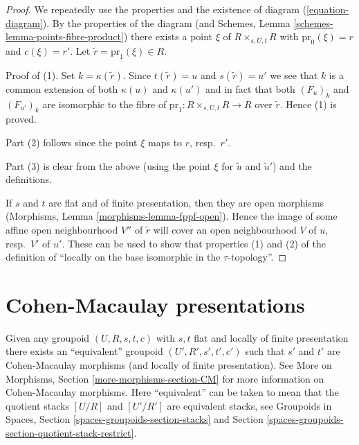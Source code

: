 \documentclass{stacks-project}
\theoremstyle{plain}
\theoremstyle{definition}
\theoremstyle{remark}
\numberwithin{equation}{subsection}
\begin{document}
\begin{proof}
We repeatedly use the properties and the existence of
diagram (\ref{equation-diagram}).
By the properties of the diagram (and
Schemes, Lemma \ref{schemes-lemma-points-fibre-product})
there exists a point $\xi$ of $R \times_{s, U, t} R$
with $\text{pr}_0(\xi) = r$ and $c(\xi) = r'$.
Let $\tilde r = \text{pr}_1(\xi) \in R$.

\medskip\noindent
Proof of (1). Set $k = \kappa(\tilde r)$. Since $t(\tilde r) = u$
and $s(\tilde r) = u'$ we see that $k$ is a common extension
of both $\kappa(u)$ and $\kappa(u')$ and in fact that
both $(F_u)_k$ and $(F_{u'})_k$ are isomorphic to the fibre of
$\text{pr}_1 : R \times_{s, U, t} R \to R$ over $\tilde r$.
Hence (1) is proved.

\medskip\noindent
Part (2) follows since the point $\xi$ maps to $r$, resp.\ $r'$.

\medskip\noindent
Part (3) is clear from the above (using the point $\xi$ for
$\tilde u$ and $\tilde u'$) and the definitions.

\medskip\noindent
If $s$ and $t$ are flat and of finite presentation, then
they are open morphisms (Morphisms, Lemma \ref{morphisms-lemma-fppf-open}).
Hence the image of some affine open neighbourhood $V''$ of $\tilde r$ will
cover an open neighbourhood $V$ of $u$, resp.\ $V'$ of $u'$.
These can be used to show that properties (1) and (2) of the
definition of ``locally on the base isomorphic in the
$\tau$-topology''.
\end{proof}







\section{Cohen-Macaulay presentations}
\label{section-CM}

\noindent
Given any groupoid $(U, R, s, t, c)$ with $s, t$ flat and
locally of finite presentation there exists an ``equivalent''
groupoid $(U', R', s', t', c')$ such that $s'$ and $t'$ are
Cohen-Macaulay morphisms (and locally of finite presentation). See
More on Morphisms, Section \ref{more-morphisms-section-CM}
for more information on Cohen-Macaulay morphisms.
Here ``equivalent'' can be taken to mean that the quotient stacks
$[U/R]$ and $[U'/R']$ are equivalent stacks, see
Groupoids in Spaces, Section \ref{spaces-groupoids-section-stacks}
and Section \ref{spaces-groupoids-section-quotient-stack-restrict}.
\end{document}
